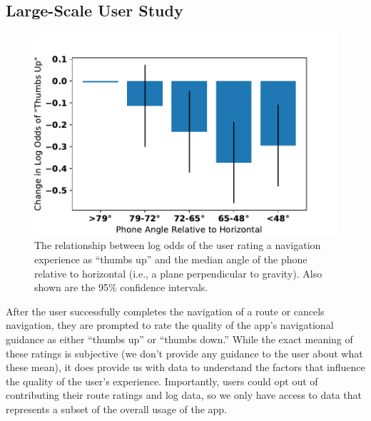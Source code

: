 \documentclass[chi_draft]{sigchi}
\begin{document}
\subsection{Large-Scale User Study}\label{sec:largescalestudy}
\begin{figure}
\includegraphics[width=\linewidth]{figures/phoneangle}
\caption{The relationship between log odds of the user rating a navigation experience as ``thumbs up'' and the median angle of the phone relative to horizontal (i.e., a plane perpendicular to gravity).  Also shown are the 95\% confidence intervals.\label{fig:devicepose}}
\end{figure}

After the user successfully completes the navigation of a route or cancels navigation, they are prompted to rate the quality of the app's navigational guidance as either ``thumbs up'' or ``thumbs down.''   While the exact meaning of these ratings is subjective (we don't provide any guidance to the user about what these mean), it does provide us with data to understand the factors that influence the quality of the user's experience.  Importantly, users could opt out of contributing their route ratings and log data, so we only have access to data that represents a subset of the overall usage of the app.
\end{document}
